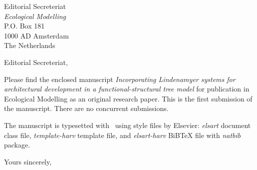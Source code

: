 \documentclass{letter}
\begin{document}
\begin{letter}{Editorial Secreteriat \\ \textsl{Ecological Modelling} \\ 
               P.O. Box 181 \\ 1000 AD Amsterdam \\ The Netherlands} 
\opening{Editorial Secreteriat,}

Please find the  enclosed manuscript \textsl{Incorporating Lindenamyer
systems     for      \mbox{architectural}     development     in     a
functional-structural  tree  model}   for  publication  in  Ecological
Modelling  as   an  original  research  paper.   This   is  the  first
\mbox{submission}   of  the  manuscript.   There  are   no  concurrent
submissions.

The  manuscript  is  typesetted  with \LaTeXe\  using  style files by Elsevier:
\textsl{elsart} document  class   file,  \textsl{template-harv}  template   file,  and
\textsl{elsart-harv} BiBTeX file with \textsl{natbib} package.

\closing{Yours sincerely,}
\end{letter}
\end{document}
